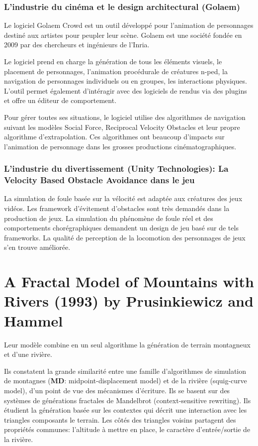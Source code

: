 \documentclass[11pt]{article}
\begin{document}
\subsubsection{L'industrie du cinéma et le design architectural (Golaem)}

Le logiciel Golaem Crowd est un outil développé pour l'animation de personnages destiné aux artistes pour peupler leur scène. Golaem est une société fondée en 2009 par des chercheurs et ingénieurs de l'Inria.

Le logiciel prend en charge la génération de tous les éléments visuels, le placement de personnages, l'animation procédurale de créatures n-ped, la navigation de personnages individuels ou en groupes, les interactions physiques. L'outil permet également d'intéragir avec des logiciels de rendus via des plugins et offre un éditeur de comportement.

Pour gérer toutes ses situations, le logiciel utilise des algorithmes de navigation suivant les modèles Social Force, Reciprocal Velocity Obstacles et leur propre algorithme d'extrapolation. Ces algorithmes ont beaucoup d'impacts sur l'animation de personnage dans les grosses productions cinématographiques.

\subsubsection{L'industrie du divertissement (Unity Technologies): La Velocity Based Obstacle Avoidance dans le jeu}

La simulation de foule basée sur la vélocité est adaptée aux créatures des jeux vidéos.
Les framework d'évitement d'obstacles sont très demandés dans la production de jeux.
La simulation du phénomène de foule réel et des comportements chorégraphiques demandent un design de jeu basé sur de tels frameworks. La qualité de perception de la locomotion des personnages de jeux s'en trouve améliorée.

\section{A Fractal Model of Mountains with Rivers (1993) by Prusinkiewicz and Hammel}

Leur modèle combine en un seul algorithme la génération de terrain montagneux et d'une rivière.

Ils constatent la grande similarité entre une famille d'algorithmes de simulation de montagnes (\textbf{MD}: midpoint-displacement model) et de la rivière (squig-curve model), d'un point de vue des mécanismes d'écriture. Ils se basent sur des systèmes de générations fractales de Mandelbrot (context-sensitive rewriting). Ils étudient la génération basée sur les contextes qui décrit une interaction avec les triangles composants le terrain. Les côtés des triangles voisins partagent des propriétés communes: l'altitude à mettre en place, le caractère d'entrée/sortie de la rivière. 
\end{document}
